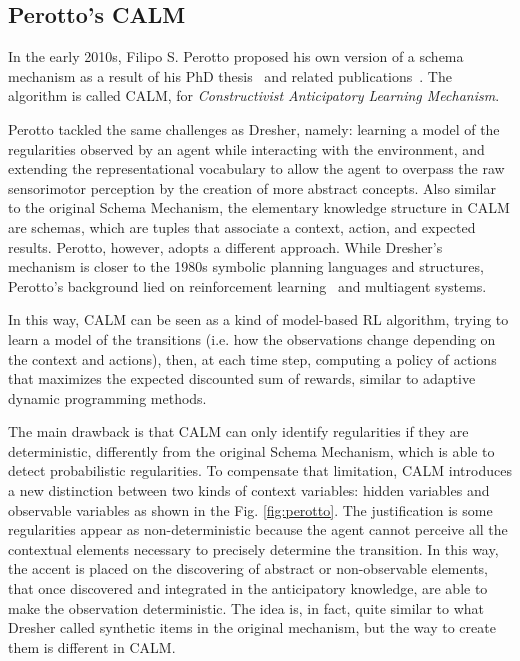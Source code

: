 \documentclass[runningheads]{llncs}
\begin{document}
\subsection{Perotto's CALM}

In the early 2010s, Filipo S. Perotto proposed his own version of a schema mechanism as a result of his PhD thesis~\cite{Perotto:2010:INP} and related publications~\cite{Perotto:2006:AAMAS,Perotto:2006:SGAI,Perotto:2007:EpiRob,Perotto:2013:CF}.
The algorithm is called CALM, for \textit{Constructivist Anticipatory Learning Mechanism}.

Perotto tackled the same challenges as Dresher, namely: learning a model of the regularities observed by an agent while interacting with the environment, and extending the representational vocabulary to allow the agent to overpass the raw sensorimotor perception by the creation of more abstract concepts.
Also similar to the original Schema Mechanism, the elementary knowledge structure in CALM are schemas, which are tuples that associate a context, action, and expected results.
Perotto, however, adopts a different approach.
While Dresher's mechanism is closer to the 1980s symbolic planning languages and structures, Perotto's background lied on reinforcement learning~\cite{Sutton:2018} and multiagent systems.

In this way, CALM can be seen as a kind of model-based RL algorithm, trying to learn a model of the transitions (i.e. how the observations change depending on the context and actions), then, at each time step, computing a policy of actions that maximizes the expected discounted sum of rewards, similar to adaptive dynamic programming methods.

The main drawback is that CALM can only identify regularities if they are deterministic, differently from the original Schema Mechanism, which is able to detect probabilistic regularities. 
To compensate that limitation, CALM introduces a new distinction between two kinds of context variables: hidden variables and observable variables as shown in the Fig. \ref{fig:perotto}.
The justification is some regularities appear as non-deterministic because the agent cannot perceive all the contextual elements necessary to precisely determine the transition.
In this way, the accent is placed on the discovering of abstract or non-observable elements, that once discovered and integrated in the anticipatory knowledge, are able to make the observation deterministic. The idea is, in fact, quite similar to what Dresher called synthetic items in the original mechanism, but the way to create them is different in CALM.
\end{document}
